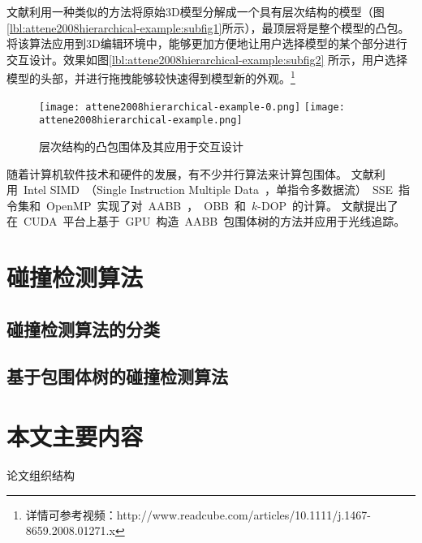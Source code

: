 文献\cite{attene2008hierarchical}利用一种类似的方法将原始3D模型分解成一个具有层次结构的模型（图\ref{lbl:attene2008hierarchical-example:subfig1}所示），最顶层将是整个模型的凸包。将该算法应用到3D编辑环境中，能够更加方便地让用户选择模型的某个部分进行交互设计。效果如图\ref{lbl:attene2008hierarchical-example:subfig2} 所示，用户选择模型的头部，并进行拖拽能够较快速得到模型新的外观。\footnote{详情可参考视频：http://www.readcube.com/articles/10.1111/j.1467-8659.2008.01271.x }

\begin{figure}[H]
  \centering
    {\texttt{[image: attene2008hierarchical-example-0.png]}}
    {\texttt{[image: attene2008hierarchical-example.png]}}
  \caption{层次结构的凸包围体及其应用于交互设计\cite{attene2008hierarchical}}
  \label{lbl:attene2008hierarchical-example}
\end{figure}

随着计算机软件技术和硬件的发展，有不少并行算法来计算包围体。
文献\cite{karlsson2010parallel}利用~Intel SIMD~（Single Instruction Multiple Data~，单指令多数据流）~SSE~指令集和~OpenMP~实现了对~AABB~，~OBB~和~$k$-DOP~的计算。
文献\cite{lauterbach2009fast}提出了在~CUDA~平台上基于~GPU~构造~AABB~包围体树的方法并应用于光线追踪。

\section{碰撞检测算法}
\label{sec:collisiondetection}

\subsection{碰撞检测算法的分类}
\label{sec:cd-category}


\subsection{基于包围体树的碰撞检测算法}
\label{sec:cd-bvh}

\section{本文主要内容}
\label{sec:structure}
论文组织结构


